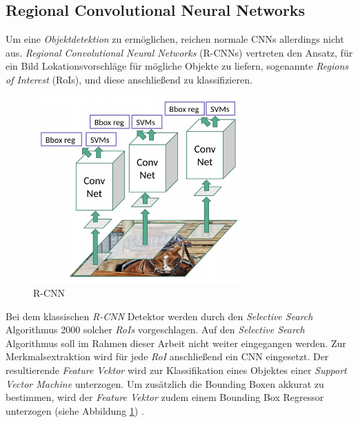 \subsection*{Regional Convolutional Neural Networks}

Um eine \textit{Objektdetektion} zu ermöglichen, reichen normale CNNs allerdings nicht aus. \textit{Regional Convolutional Neural Networks} (R-CNNs) vertreten den Ansatz, für ein Bild Lokationsvorschläge für mögliche Objekte zu liefern, sogenannte \textit{Regions of Interest} (RoIs), und diese anschließend zu klassifizieren. 

\begin{figure}[ht]
	\begin{center}
		\includegraphics[width=8cm]{Bilder/rcnn.png} 
		\caption[R-CNN]{R-CNN \cite{RohithGandhi.20180709}}
		\label{rcnn}
	\end{center}
\end{figure}

Bei dem klassischen \textit{R-CNN} Detektor werden durch den \textit{Selective Search} Algorithmus 2000 solcher \textit{RoIs} vorgeschlagen. Auf den \textit{Selective Search} Algorithmus soll im Rahmen dieser Arbeit nicht weiter eingegangen werden. Zur Merkmalsextraktion wird für jede \textit{RoI} anschließend ein CNN eingesetzt. Der resultierende \textit{Feature Vektor} wird zur Klassifikation eines Objektes einer \textit{Support Vector Machine} unterzogen. Um zusätzlich die Bounding Boxen akkurat zu bestimmen, wird der \textit{Feature Vektor} zudem einem Bounding Box Regressor unterzogen (siehe Abbildung \ref{rcnn}) \cite{RohithGandhi.20180709}. 

